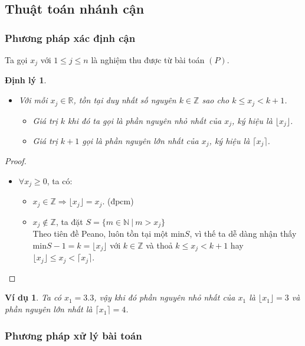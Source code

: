 \documentclass[12pt,a4paper]{report}
\newtheorem{dl}{Định lý}
\newtheorem{vd}{Ví dụ}
\begin{document}
\subsection*{Thuật toán nhánh cận}

\subsubsection*{Phương pháp xác định cận}
Ta gọi $x_j$ với $1 \leq j \leq n$ là nghiệm thu được từ bài toán $(P)$.
\begin{dl}\label{cmnguyen}
	\phantom{}
\begin{itemize}
\item Với mỗi $x_j \in \mathbb{R}$, tồn tại duy nhất số nguyên $k \in \mathbb{Z}$ sao cho $k \leq x_j < k+1$.
\begin{itemize}
\item Giá trị $k$ khi đó ta gọi là phần nguyên nhỏ nhất của $x_j$, ký hiệu là $\lfloor x_j \rfloor$.
\item Giá trị $k+1$ gọi là phần nguyên lớn nhất của $x_j$, ký hiệu là $\lceil x_j \rceil$.
\end{itemize}
\end{itemize}
\end{dl}



\begin{proof}
\phantom{}
\begin{itemize}
\item $\forall x_j \geq 0$, ta có:
\begin{itemize}
\item $x_j \in \mathbb{Z} \Rightarrow \lfloor x_j \rfloor =x_j$. (đpcm)
\item $x_j \notin \mathbb{Z}$, ta đặt $S=\{ m \in \mathbb{N} \: \vert \: m > x_j \}$ \\ Theo tiên đề Peano, luôn tồn tại một min$S$, vì thế ta dễ dàng nhận thấy min$S -1=k=\lfloor x_j \rfloor$ với $k \in \mathbb{Z}$ và thoả $k \leq x_j < k+1$ hay $\lfloor x_j \rfloor \leq x_j <\lceil x_j \rceil$. 
\end{itemize}
\end{itemize}
\end{proof}

\begin{vd}
Ta có $x_1=3.3$, vậy khi đó phần nguyên nhỏ nhất của $x_1$ là $\lfloor x_1 \rfloor = 3$ và phần nguyên lớn nhất là $\lceil x_1 \rceil =4$.
\end{vd}


\subsubsection*{Phương pháp xử lý bài toán}
\end{document}
